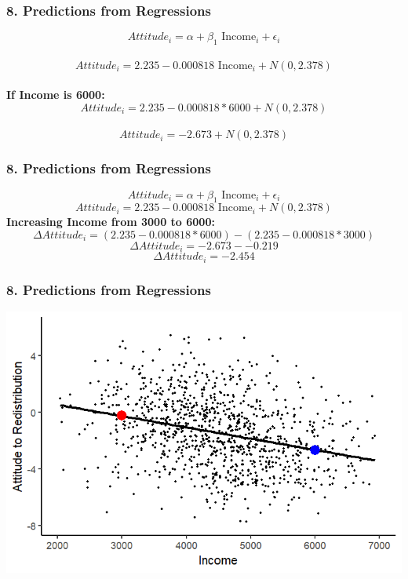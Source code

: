 \documentclass[xcolor=x11names,compress]{beamer}\usepackage[]{graphicx}\usepackage[]{color}
\makeatletter
\def\maxwidth{ %
  \ifdim\Gin@nat@width>\linewidth
    \linewidth
  \else
    \Gin@nat@width
  \fi
}
\newenvironment{knitrout}{}{} %
\renewcommand{\(}{\begin{columns}}
\renewcommand{\)}{\end{columns}}
\newcommand{\<}[1]{\begin{column}{#1}}
\renewcommand{\>}{\end{column}}
\makeatother
\begin{document}
\begin{frame}
\frametitle{8. Predictions from Regressions}
$$Attitude_i = \alpha + \beta_1 \text{ Income}_i + \epsilon_i$$ \\
$$Attitude_i = 2.235 - 0.000818 \text{ Income}_i + N(0,2.378)$$ \\
\textbf{If Income is 6000:}  \\
$$Attitude_i = 2.235-0.000818*6000 + N(0,2.378)$$ \\
$$Attitude_i = -2.673 + N(0,2.378)$$
\end{frame}

\begin{frame}
\frametitle{8. Predictions from Regressions}
$$Attitude_i = \alpha + \beta_1 \text{ Income}_i + \epsilon_i$$
$$Attitude_i = 2.235 - 0.000818 \text{ Income}_i + N(0,2.378)$$
\textbf{Increasing Income from 3000 to 6000:} \\
$$\Delta Attitude_i = (2.235-0.000818*6000) - (2.235-0.000818*3000)$$
$$\Delta Attitude_i = -2.673 - -0.219$$
$$\Delta Attitude_i = -2.454$$
\end{frame}

\begin{frame}
\frametitle{8. Predictions from Regressions}
\begin{knitrout}
\color{fgcolor}
\includegraphics[width=\maxwidth]{figure/predictions1-1} 

\end{knitrout}
\end{frame}
\end{document}
